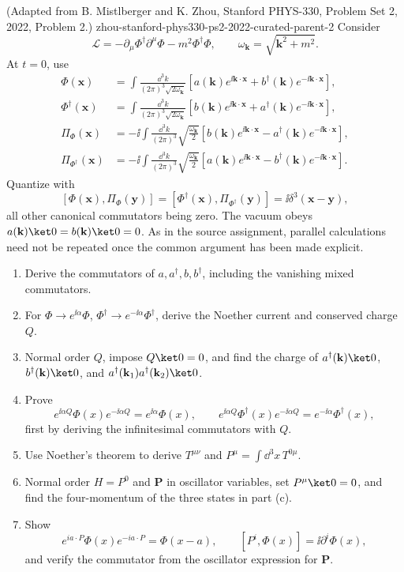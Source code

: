 \begin{enumerate}
  {(Adapted from B. Mistlberger and K. Zhou, Stanford PHYS-330, Problem Set 2, 2022, Problem 2.)}
  {zhou-stanford-phys330-ps2-2022-curated-parent-2}
Consider
\[
 \mathcal L=-\partial_\mu\Phi^\dagger\partial^\mu\Phi
 -m^2\Phi^\dagger\Phi,
\qquad \omega_{\mathbf k}=\sqrt{\mathbf k^2+m^2}.
\]
At \(t=0\), use
\[
\begin{split}
\Phi(\mathbf x)&=\int\frac{\dd^3k}{(2\pi)^3\sqrt{2\omega_{\mathbf k}}}
\left[a(\mathbf k)e^{\ii\mathbf k\cdot\mathbf x}
+b^\dagger(\mathbf k)e^{-\ii\mathbf k\cdot\mathbf x}\right],\\
\Phi^\dagger(\mathbf x)&=\int\frac{\dd^3k}{(2\pi)^3\sqrt{2\omega_{\mathbf k}}}
\left[b(\mathbf k)e^{\ii\mathbf k\cdot\mathbf x}
+a^\dagger(\mathbf k)e^{-\ii\mathbf k\cdot\mathbf x}\right],\\
\Pi_\Phi(\mathbf x)&=-\ii\int\frac{\dd^3k}{(2\pi)^3}
\sqrt{\frac{\omega_{\mathbf k}}2}
\left[b(\mathbf k)e^{\ii\mathbf k\cdot\mathbf x}
-a^\dagger(\mathbf k)e^{-\ii\mathbf k\cdot\mathbf x}\right],\\
\Pi_{\Phi^\dagger}(\mathbf x)&=-\ii\int\frac{\dd^3k}{(2\pi)^3}
\sqrt{\frac{\omega_{\mathbf k}}2}
\left[a(\mathbf k)e^{\ii\mathbf k\cdot\mathbf x}
-b^\dagger(\mathbf k)e^{-\ii\mathbf k\cdot\mathbf x}\right].
\end{split}
\]
Quantize with
\[
 [\Phi(\mathbf x),\Pi_\Phi(\mathbf y)]
 =[\Phi^\dagger(\mathbf x),\Pi_{\Phi^\dagger}(\mathbf y)]
 =\ii\delta^3(\mathbf x-\mathbf y),
\]
all other canonical commutators being zero.  The vacuum obeys
\(a(\mathbf k)\ket0=b(\mathbf k)\ket0=0\).  As in the source
assignment, parallel calculations need not be repeated once the common
argument has been made explicit.
\begin{enumerate}
\item
Derive the commutators of \(a,a^\dagger,b,b^\dagger\), including the
vanishing mixed commutators.
\item
For
\(\Phi\to e^{\ii\alpha}\Phi\),
\(\Phi^\dagger\to e^{-\ii\alpha}\Phi^\dagger\), derive the Noether current
and conserved charge \(Q\).
\item
Normal order \(Q\), impose \(Q\ket0=0\), and find the charge of
\(a^\dagger(\mathbf k)\ket0\),
\(b^\dagger(\mathbf k)\ket0\), and
\(a^\dagger(\mathbf k_1)a^\dagger(\mathbf k_2)\ket0\).
\item
Prove
\[
 e^{\ii\alpha Q}\Phi(x)e^{-\ii\alpha Q}=e^{\ii\alpha}\Phi(x),
 \qquad
 e^{\ii\alpha Q}\Phi^\dagger(x)e^{-\ii\alpha Q}
 =e^{-\ii\alpha}\Phi^\dagger(x),
\]
first by deriving the infinitesimal commutators with \(Q\).
\item
Use Noether's theorem to derive \(T^{\mu\nu}\) and
\(P^\mu=\int \dd^3x\,T^{0\mu}\).
\item
Normal order \(H=P^0\) and \(\mathbf P\) in oscillator variables, set
\(P^\mu\ket0=0\), and find the four-momentum of the three states in
part (c).
\item
Show
\[
 e^{ia\cdot P}\Phi(x)e^{-ia\cdot P}=\Phi(x-a),
 \qquad
 [P^i,\Phi(x)]=\ii\partial^i\Phi(x),
\]
and verify the commutator from the oscillator expression for
\(\mathbf P\).
\end{enumerate}


\end{enumerate}
